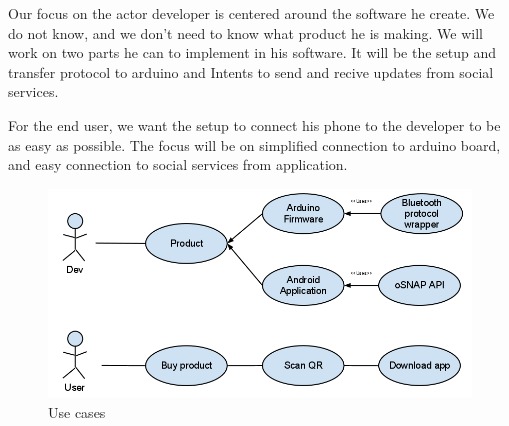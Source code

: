 Our focus on the actor developer is centered around the software he create. We do not know, and we don't need to know what product he is making. We will work on two parts he can to implement in his software. It will be the setup and transfer protocol to arduino and Intents to send and recive updates from social services.

For the end user, we want the setup to connect his phone to the developer to be as easy as possible. The focus will be on simplified connection to arduino board, and easy connection to social services from application.
\begin{figure}[hb!]
\centering \includegraphics[scale=0.50]{img/use-cases.png}
\caption{Use cases}
\label{fig:architecture}
\end{figure}
